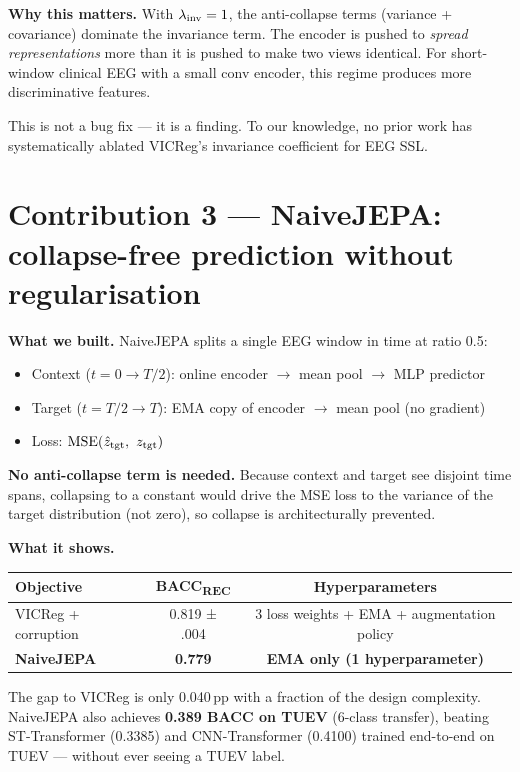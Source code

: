 \documentclass[11pt,a4paper]{article}
\begin{document}
\textbf{Why this matters.}
With $\lambda_{\rm inv} = 1$, the anti-collapse terms (variance + covariance)
dominate the invariance term.  The encoder is pushed to \emph{spread
representations} more than it is pushed to make two views identical.
For short-window clinical EEG with a small conv encoder, this regime
produces more discriminative features.

This is not a bug fix — it is a finding.  To our knowledge, no prior work
has systematically ablated VICReg's invariance coefficient for EEG SSL.

\bigskip

\section{Contribution 3 — NaiveJEPA: collapse-free prediction without regularisation}

\textbf{What we built.}
NaiveJEPA splits a single EEG window in time at ratio 0.5:
\begin{itemize}[noitemsep]
  \item Context ($t = 0 \to T/2$): online encoder $\to$ mean pool $\to$ MLP predictor
  \item Target ($t = T/2 \to T$): EMA copy of encoder $\to$ mean pool (no gradient)
  \item Loss: $\mathrm{MSE}(\hat{z}_{\rm tgt},\ z_{\rm tgt})$
\end{itemize}
\textbf{No anti-collapse term is needed.}  Because context and target see
disjoint time spans, collapsing to a constant would drive the MSE loss to
the variance of the target distribution (not zero), so collapse is
architecturally prevented.

\textbf{What it shows.}
\begin{center}
\begin{tabular}{lcc}
\toprule
Objective & BACC\textsubscript{REC} & Hyperparameters \\
\midrule
VICReg + corruption & 0.819 ± .004 & 3 loss weights + EMA + augmentation policy \\
\textbf{NaiveJEPA} & \textbf{0.779} & \textbf{EMA only (1 hyperparameter)} \\
\bottomrule
\end{tabular}
\end{center}
The gap to VICReg is only 0.040\,pp with a fraction of the design complexity.
NaiveJEPA also achieves \textbf{0.389 BACC on TUEV} (6-class transfer),
beating ST-Transformer (0.3385) and CNN-Transformer (0.4100) trained
end-to-end on TUEV — without ever seeing a TUEV label.
\end{document}
